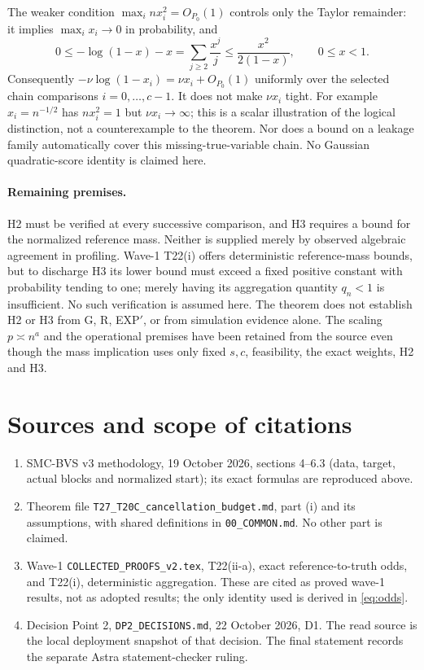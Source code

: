 ﻿\documentclass[11pt]{article}
\newcommand{\Op}{O_{P_0}}
\begin{document}
The weaker condition $\max_i nx_i^2=\Op(1)$ controls only the Taylor remainder: it implies $\max_i x_i\to0$ in probability, and
\[
 0\le-\log(1-x)-x=\sum_{j\ge2}\frac{x^j}{j}
 \le\frac{x^2}{2(1-x)},\qquad 0\le x<1.
\]
Consequently $-\nu\log(1-x_i)=\nu x_i+\Op(1)$ uniformly over the selected chain comparisons $i=0,\ldots,c-1$. It does not make $\nu x_i$ tight. For example $x_i=n^{-1/2}$ has $nx_i^2=1$ but $\nu x_i\to\infty$; this is a scalar illustration of the logical distinction, not a counterexample to the theorem. Nor does a bound on a leakage family automatically cover this missing-true-variable chain. No Gaussian quadratic-score identity is claimed here.

\paragraph{Remaining premises.}
H2 must be verified at every successive comparison, and H3 requires a bound for the normalized reference mass. Neither is supplied merely by observed algebraic agreement in profiling. Wave-1 T22(i) offers deterministic reference-mass bounds, but to discharge H3 its lower bound must exceed a fixed positive constant with probability tending to one; merely having its aggregation quantity $q_n<1$ is insufficient. No such verification is assumed here. The theorem does not establish H2 or H3 from G, R, EXP$'$, or from simulation evidence alone. The scaling $p\asymp n^a$ and the operational premises have been retained from the source even though the mass implication uses only fixed $s,c$, feasibility, the exact weights, H2 and H3.

\section*{Sources and scope of citations}
\begin{enumerate}
\item SMC-BVS v3 methodology, 19 October 2026, sections 4--6.3 (data, target, actual blocks and normalized start); its exact formulas are reproduced above.
\item Theorem file \texttt{T27\_T20C\_cancellation\_budget.md}, part (i) and its assumptions, with shared definitions in \texttt{00\_COMMON.md}. No other part is claimed.
\item Wave-1 \texttt{COLLECTED\_PROOFS\_v2.tex}, T22(ii-a), exact reference-to-truth odds, and T22(i), deterministic aggregation. These are cited as proved wave-1 results, not as adopted results; the only identity used is derived in \eqref{eq:odds}.
\item Decision Point 2, \texttt{DP2\_DECISIONS.md}, 22 October 2026, D1. The read source is the local deployment snapshot of that decision. The final statement records the separate Astra statement-checker ruling.
\end{enumerate}
\end{document}
